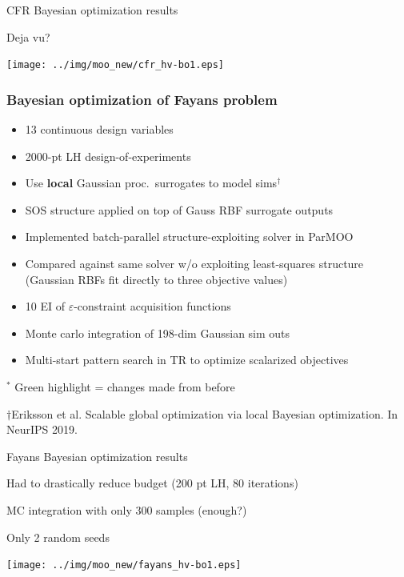 \documentclass[aspectratio=169]{beamer}
\begin{document}
\begin{frame}{CFR Bayesian optimization results}

Deja vu?\\
\begin{center}
\texttt{[image: ../img/moo\_new/cfr\_hv-bo1.eps]}
\end{center}
\end{frame}

\begin{frame}\frametitle{Bayesian optimization of Fayans problem}
\begin{itemize}
\item 13 continuous design variables
\item 2000-pt LH design-of-experiments
\item Use {\bf local} Gaussian proc.\ surrogates to model sims$^\dagger$
\item SOS structure applied on top of Gauss RBF surrogate outputs
\item Implemented batch-parallel
{\color{blue} structure-exploiting solver in ParMOO}
\item Compared against
{\color{red} same solver w/o exploiting least-squares structure}
(Gaussian RBFs fit directly to three objective values)
\item {\color{green}10 EI of $\varepsilon$-constraint acquisition functions}
\item {\color{green}Monte carlo integration of 198-dim Gaussian sim outs}
\item {\color{green}Multi-start pattern search in TR to optimize scalarized objectives}
\end{itemize}

\bigskip

$^*${\color{green} Green highlight} = changes made from before

\vfill

{\tiny\sl

$\dagger$Eriksson et al.
Scalable global optimization via local Bayesian optimization.
In NeurIPS 2019.

}
\end{frame}

\begin{frame}{Fayans Bayesian optimization results}

Had to drastically reduce budget (200 pt LH, 80 iterations)

\medskip

MC integration with only 300 samples (enough?)

\medskip

Only 2 random seeds

\medskip

\begin{center}
\texttt{[image: ../img/moo\_new/fayans\_hv-bo1.eps]}
\end{center}
\end{frame}
\end{document}
